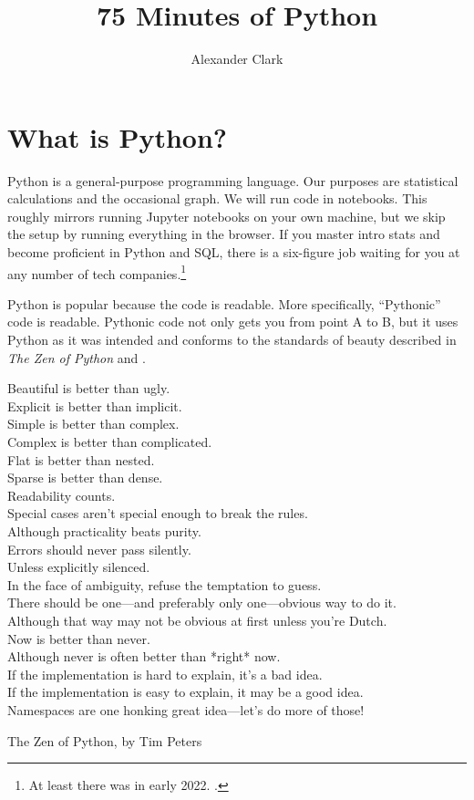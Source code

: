 \documentclass{article}
\author{Alexander Clark\\ \scalebox{0.7}{Columbia University - Stats 1101}}
\title{75 Minutes of Python}
\begin{document}
\maketitle


\section{What is Python?}

Python is a general-purpose programming language. Our purposes are statistical calculations and the occasional graph. We will run code in  notebooks. This roughly mirrors running Jupyter notebooks on your own machine, but we skip the setup by running everything in the browser. If you master intro stats and become proficient in Python and SQL, there is a six-figure job waiting for you at any number of tech companies.\footnote{At least there was in early 2022. .} 

Python is popular because the code is readable. More specifically, ``Pythonic'' code is readable. Pythonic code not only gets you from point A to B, but it uses Python as it was intended and conforms to the standards of beauty described in \emph{The Zen of Python} and .

\begin{footnotesize}
\begin{displayquote}
Beautiful is better than ugly.\\
Explicit is better than implicit.\\
Simple is better than complex.\\
Complex is better than complicated.\\
Flat is better than nested.\\
Sparse is better than dense.\\
Readability counts.\\
Special cases aren't special enough to break the rules.\\
Although practicality beats purity.\\
Errors should never pass silently.\\
Unless explicitly silenced.\\
In the face of ambiguity, refuse the temptation to guess.\\
There should be one---and preferably only one---obvious way to do it.\\
Although that way may not be obvious at first unless you're Dutch.\\
Now is better than never.\\
Although never is often better than *right* now.\\
If the implementation is hard to explain, it's a bad idea.\\
If the implementation is easy to explain, it may be a good idea.\\
Namespaces are one honking great idea---let's do more of those!
\end{displayquote}
\hfill The Zen of Python, by Tim Peters
\end{footnotesize}
\end{document}
